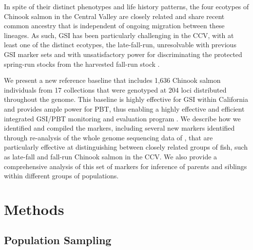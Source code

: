 In spite of their distinct phenotypes and life history patterns, the four ecotypes of Chinook salmon in the Central Valley are closely related
\citep{clemento2014evaluation} and share recent common ancestry that is independent of ongoing migration between these lineages. As such, GSI
has been particularly challenging in the CCV, with at least one of the distinct ecotypes, the late-fall-run, unresolvable with previous GSI marker sets
and with unsatisfactory power for discriminating the protected spring-run stocks from the
harvested fall-run stock \citep{seeb2007development,clemento2014evaluation}.

We present a new reference baseline that includes 1,636 Chinook salmon individuals from 17 collections that were genotyped at 204 loci distributed throughout the genome.
This baseline is highly effective for GSI within California and provides ample power for PBT, thus enabling a highly effective and efficient integrated GSI/PBT monitoring and evaluation program 
\citep{garza2007large,beacham2021parentage}.
We describe how we identified and compiled the markers, including several new markers
identified through re-analysis of the whole genome sequencing data of \citet{thompson2020complex},
that are particularly effective at distinguishing between closely related groups of fish,
such as late-fall and fall-run Chinook salmon in the CCV.  We also provide a comprehensive analysis of this
set of markers for inference of parents and siblings within different groups of populations.



 \section*{Methods}

\subsection*{Population Sampling}

